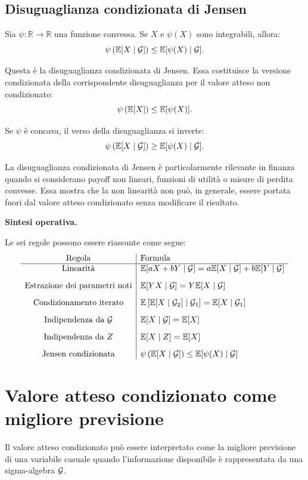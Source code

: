 \subsection{Disuguaglianza condizionata di Jensen}

Sia $\psi:\mathbb{R}\to\mathbb{R}$ una funzione convessa. Se $X$ e
$\psi(X)$ sono integrabili, allora:
\[
\psi\left(
\mathbb{E}[X\mid\mathcal{G}]
\right)
\leq
\mathbb{E}[\psi(X)\mid\mathcal{G}].
\]

Questa \`{e} la disuguaglianza condizionata di Jensen. Essa costituisce la
versione condizionata della corrispondente disuguaglianza per il valore atteso
non condizionato:
\[
\psi\left(\mathbb{E}[X]\right)
\leq
\mathbb{E}[\psi(X)].
\]

Se $\psi$ \`{e} concava, il verso della disuguaglianza si inverte:
\[
\psi\left(
\mathbb{E}[X\mid\mathcal{G}]
\right)
\geq
\mathbb{E}[\psi(X)\mid\mathcal{G}].
\]

La disuguaglianza condizionata di Jensen \`{e} particolarmente rilevante in
finanza quando si considerano payoff non lineari, funzioni di utilit\`{a} o
misure di perdita convesse. Essa mostra che la non linearit\`{a} non pu\`{o},
in generale, essere portata fuori dal valore atteso condizionato senza
modificare il risultato.

\medskip

\noindent
\textbf{Sintesi operativa.}

Le sei regole possono essere riassunte come segue:
\[
\begin{array}{c|l}
\text{Regola} & \text{Formula} \\
\hline
\text{Linearit\`{a}} &
\mathbb{E}[aX+bY\mid\mathcal{G}]
=
a\mathbb{E}[X\mid\mathcal{G}]
+
b\mathbb{E}[Y\mid\mathcal{G}]
\\[0.3cm]
\text{Estrazione dei parametri noti} &
\mathbb{E}[YX\mid\mathcal{G}]
=
Y\mathbb{E}[X\mid\mathcal{G}]
\\[0.3cm]
\text{Condizionamento iterato} &
\mathbb{E}\left[
\mathbb{E}[X\mid\mathcal{G}_2]
\mid
\mathcal{G}_1
\right]
=
\mathbb{E}[X\mid\mathcal{G}_1]
\\[0.3cm]
\text{Indipendenza da } \mathcal{G} &
\mathbb{E}[X\mid\mathcal{G}]
=
\mathbb{E}[X]
\\[0.3cm]
\text{Indipendenza da } Z &
\mathbb{E}[X\mid Z]
=
\mathbb{E}[X]
\\[0.3cm]
\text{Jensen condizionata} &
\psi\left(\mathbb{E}[X\mid\mathcal{G}]\right)
\leq
\mathbb{E}[\psi(X)\mid\mathcal{G}]
\end{array}
\]

\section{Valore atteso condizionato come migliore previsione}

Il valore atteso condizionato pu\`{o} essere interpretato come la migliore
previsione di una variabile casuale quando l'informazione disponibile \`{e}
rappresentata da una sigma-algebra $\mathcal{G}$.

